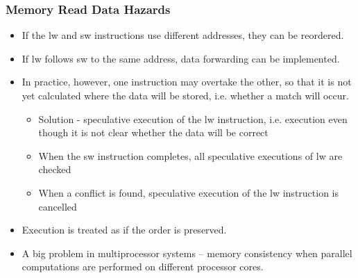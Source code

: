 \documentclass{beamer}
\begin{document}
\begin{frame}
\frametitle{Memory Read Data Hazards}

\begin{itemize}
\item If the lw and sw instructions use different addresses, they can be reordered.
\item If lw follows sw to the same address, data forwarding can be implemented.
\item In practice, however, one instruction may overtake the other, so that it is not yet calculated where the data will be stored, i.e. whether a match will occur.
\begin{itemize}
\item Solution - speculative execution of the lw instruction, i.e. execution even though it is not clear whether the data will be correct
\item When the sw instruction completes, all speculative executions of lw are checked
\item When a conflict is found, speculative execution of the lw instruction is cancelled
\end{itemize}
\item Execution is treated as if the order is preserved.
\item A big problem in multiprocessor systems -- memory consistency when parallel computations are performed on different processor cores.
\end{itemize}

\end{frame}
\end{document}
